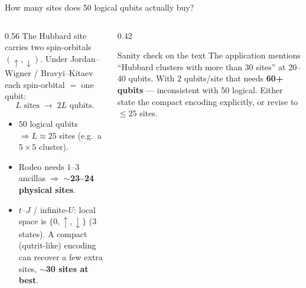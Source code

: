 \documentclass[aspectratio=169,11pt]{beamer}
\begin{document}
\begin{frame}{How many sites does 50 logical qubits actually buy?}
\begin{columns}[T]
\begin{column}{0.56\textwidth}
The Hubbard site carries two spin-orbitals $(\uparrow,\downarrow)$.
Under Jordan--Wigner / Bravyi--Kitaev each spin-orbital $=$ one qubit:
\[
   L \text{ sites} \;\longrightarrow\; 2L \text{ qubits}.
\]
\begin{itemize}
  \item $50$ logical qubits $\Rightarrow L \approx 25$ sites (e.g.\ a $5\times5$ cluster).
  \item Rodeo needs $1$--$3$ ancillas $\Rightarrow$ \textbf{$\sim$23--24 physical sites}.
  \item $t$--$J$ / infinite-$U$: local space is $\{0,\uparrow,\downarrow\}$ (3 states).
        A compact (qutrit-like) encoding can recover a few extra sites,
        \textbf{$\sim$30 sites at best}.
\end{itemize}
\end{column}
\begin{column}{0.42\textwidth}
\begin{block}{Sanity check on the text}
The application mentions ``Hubbard clusters with more than 30 sites'' at 20--40
qubits. With $2$ qubits/site that needs \textbf{60+ qubits} --- inconsistent with
50 logical. Either state the compact encoding explicitly, or revise to
$\le 25$ sites.
\end{block}
\end{column}
\end{columns}
\end{frame}
\end{document}
